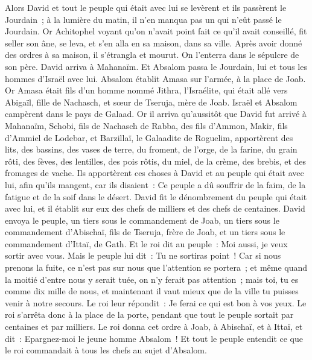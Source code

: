 \begin{multicols}{2}
Alors David et tout le peuple qui était avec lui se levèrent et ils passèrent le Jourdain~; à la lumière du matin, il n'en manqua pas un qui n'eût passé le Jourdain.
Or Achitophel voyant qu'on n'avait point fait ce qu'il avait conseillé, fit seller son âne, se leva, et s'en alla en sa maison, dans sa ville. Après avoir donné des ordres à sa maison, il s'étrangla et mourut. On l'enterra dans le sépulcre de son père.
David arriva à Mahanaïm. Et Absalom passa le Jourdain, lui et tous les hommes d'Israël avec lui.
Absalom établit Amasa sur l'armée, à la place de Joab. Or Amasa était fils d'un homme nommé Jithra, l'Israélite, qui était allé vers Abigaïl, fille de Nachasch, et sœur de Tseruja, mère de Joab.
Israël et Absalom campèrent dans le pays de Galaad.
Or il arriva qu'aussitôt que David fut arrivé à Mahanaïm, Schobi, fils de Nachasch de Rabba, des fils d'Ammon, Makir, fils d'Ammiel de Lodebar, et Barzillaï, le Galaadite de Roguelim,
apportèrent des lits, des bassins, des vases de terre, du froment, de l'orge, de la farine, du grain rôti, des fèves, des lentilles, des pois rôtis,
du miel, de la crème, des brebis, et des fromages de vache. Ils apportèrent ces choses à David et au peuple qui était avec lui, afin qu'ils mangent, car ils disaient~: Ce peuple a dû souffrir de la faim, de la fatigue et de la soif dans le désert.
\VerseOne{}David fit le dénombrement du peuple qui était avec lui, et il établit sur eux des chefs de milliers et des chefs de centaines.
David envoya le peuple, un tiers sous le commandement de Joab, un tiers sous le commandement d'Abischaï, fils de Tseruja, frère de Joab, et un tiers sous le commandement d'Ittaï, de Gath. Et le roi dit au peuple~: Moi aussi, je veux sortir avec vous.
Mais le peuple lui dit~: Tu ne sortiras point~! Car si nous prenons la fuite, ce n'est pas sur nous que l'attention se portera~; et même quand la moitié d'entre nous y serait tuée, on n'y ferait pas attention~; mais toi, tu es comme dix mille de nous, et maintenant il vaut mieux que de la ville tu puisses venir à notre secours.
Le roi leur répondit~: Je ferai ce qui est bon à vos yeux. Le roi s'arrêta donc à la place de la porte, pendant que tout le peuple sortait par centaines et par milliers.
Le roi donna cet ordre à Joab, à Abischaï, et à Ittaï, et dit~: Epargnez-moi le jeune homme Absalom~! Et tout le peuple entendit ce que le roi commandait à tous les chefs au sujet d'Absalom.

\end{multicols}
